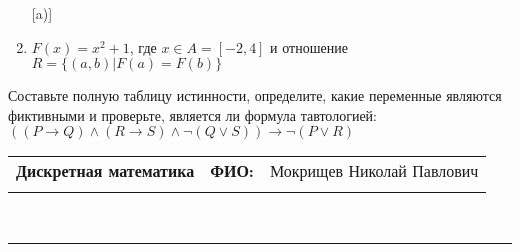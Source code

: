 \documentclass[10pt]{exam}
\newcommand{\class}{Дискретная математика}
\newcommand{\examdate}{}
\begin{document}
\begin{questions}
\begin{enumerate} [a)]
\item $F(x)=x^{2}+1$, где $x \in A = [-2, 4]$ и отношение $R = \{(a,b)|F(a) = F(b)\}$
\end{enumerate}\question Составьте полную таблицу истинности, определите, какие переменные являются фиктивными и проверьте, является ли формула тавтологией:
$((P \rightarrow Q) \land (R \rightarrow S) \land \neg (Q \lor S)) \rightarrow \neg (P \lor R)$

\end{questions}
\newpage
\begin{flushright}
\begin{tabular}{p{2.8in} r l}
\textbf{\class} & \textbf{ФИО:} &Мокрищев Николай Павлович
\\

\textbf{\examdate} &&\\
\end{tabular}\\
\end{flushright}
\rule[1ex]{\textwidth}{.1pt}
\end{document}
